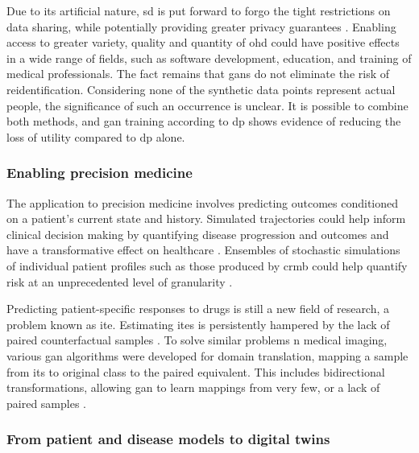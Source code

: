             Due to its artificial nature, \gls{sd} is put forward to forgo the tight restrictions on data sharing, while potentially providing greater privacy guarantees \cite{Beaulieu-Jones2019-ct, baowaly_2019_IEEE, baowaly_2019_jamia,esteban2017real,Fisher2019,walsh2020generating, chin2019generation}. Enabling access to greater variety, quality and quantity of \gls{ohd} could have positive effects in a wide range of fields, such as software development, education, and training of medical professionals. The fact remains that \glspl{gan} do not eliminate the risk of reidentification. Considering none of the synthetic data points represent actual people, the significance of such an occurrence is unclear. It is possible to combine both methods, and \gls{gan} training according to \gls{dp} shows evidence of reducing the loss of utility compared to \gls{dp} alone.
    
        \subsubsection{Enabling precision medicine}\label{sec:precision_med}
    
            The application to precision medicine involves predicting outcomes conditioned on a patient's current state and history. Simulated trajectories could help inform clinical decision making by quantifying disease progression and outcomes and have a transformative effect on healthcare \cite{walsh2020generating, Fisher2019}. Ensembles of stochastic simulations of individual patient profiles such as those produced by \gls{crmb} could help quantify risk at an unprecedented level of granularity \cite{Fisher2019}.\par
            Predicting patient-specific responses to drugs is still a new field of research, a problem known as \gls{ite}. Estimating \glspl{ite} is persistently hampered by the lack of paired counterfactual samples \cite{Yoon2018-ite, chu2019treatment}. To solve similar problems n medical imaging, various \gls{gan} algorithms were developed for domain translation, mapping a sample from its to original class to the paired equivalent. This includes bidirectional transformations, allowing \gls{gan} to learn mappings from very few, or a lack of paired samples \cite{Wolterink2017DeepMT, CycleGAN2017, mcdermott2018semi}.
    
        \subsubsection{From patient and disease models to digital twins}\label{sec:models_twins}
    
